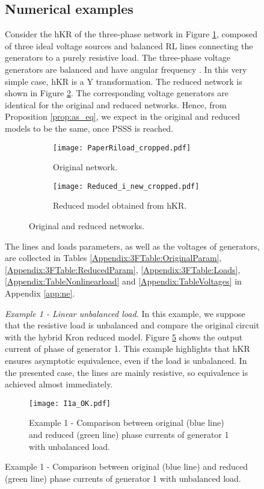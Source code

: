 \documentclass[a4paper]{article}
\theoremstyle{plain}
\begin{document}
\begin{figure}[htb]
\begin{circuitikz}[scale=.91,transform shape, color=black]
	\subsection{Numerical examples}
\label{subsec:ne}
    Consider the hKR of the three-phase network in Figure \ref{Fig:NetworkOriginal}, composed of three ideal voltage sources and balanced RL lines connecting the generators to a purely resistive load. The three-phase voltage generators are balanced and have angular frequency . In this very simple case, hKR is a Y transformation. The reduced network is shown in Figure \ref{Fig:NetworkReduced}. 
    The corresponding voltage generators are identical for the original and reduced networks. Hence, from Proposition \ref{prop:as_eq}, we expect  in the original and reduced models to be the same, once PSSS is reached.
 \begin{figure}
    	\centering
    	\begin{subfigure}[htb]{0.5\textwidth}
    		\centering
    		\texttt{[image: PaperRiload\_cropped.pdf]}
    		\caption{Original network.}
    		\label{Fig:NetworkOriginal}
    	\end{subfigure}
    	\begin{subfigure}[htb]{0.5\textwidth}
    		\centering
    		\vspace{5mm}
    		\texttt{[image: Reduced\_i\_new\_cropped.pdf]}
    		\caption{Reduced model obtained from hKR.}
    		\label{Fig:NetworkReduced}
    	\end{subfigure}
    	\caption{Original and reduced networks.}
    	\label{fig:21nodes_performance}
    \end{figure}
    The lines and loads parameters, as well as the voltages of generators,  are collected in Tables \ref{Appendix:3FTable:OriginalParam}, \ref{Appendix:3FTable:ReducedParam}, \ref{Appendix:3FTable:Loads}, \ref{Appendix:TableNonlinearload} and \ref{Appendix:TableVoltages} in Appendix \ref{app:ne}.
    
    \textit{Example 1 - Linear unbalanced load.}
    In this example, we suppose that the resistive load is unbalanced and compare the original circuit with the hybrid Kron reduced model. 
	Figure \ref{Fig:Ex1} shows the output current of phase  of generator 1. 
	This example highlights that hKR ensures asymptotic equivalence, even if the load is unbalanced. In the presented case, the lines are mainly resistive, so equivalence is achieved almost immediately. 
\begin{figure}
			\centering
\texttt{[image: I1a\_OK.pdf]}
		\caption{Example 1 - Comparison between original (blue line) and reduced (green line) phase  currents of generator 1 with unbalanced load.}
		\label{Fig:Ex1}
\end{figure}


\end{circuitikz}
\end{figure}
\end{document}

